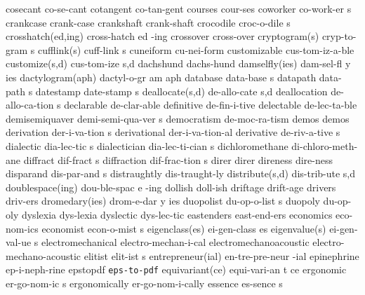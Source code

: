 \1 cosecant		co-se-cant
\1 cotangent		co-tan-gent
\1 courses		cour-ses
\5 coworker		co-work-er s		%
\1 crankcase		crank-case		%
\1 crankshaft		crank-shaft
\5 crocodile		croc-o-dile s
\2 crosshatch(ed,ing)	cross-hatch ed -ing
\1 crossover		cross-over		%
\2 cryptogram(s)	cryp-to-gram s		%
\2 cufflink(s)		cuff-link s		%
\1 cuneiform		cu-nei-form		%
\1 customizable		cus-tom-iz-a-ble	%
\2 customize(s,d)	cus-tom-ize s,d		%
\1 dachshund		dachs-hund
\3 damselfly(ies)	dam-sel-fl y ies	%
\3 dactylogram(aph)	dactyl-o-gr am aph	%
\5 database		data-base s
\5 datapath		data-path s
\5 datestamp		date-stamp s            %
\2 deallocate(s,d)	de-allo-cate s,d	%
\5 deallocation		de-allo-ca-tion s	%
\1 declarable		de-clar-able
\1 definitive		de-fin-i-tive
\1 delectable		de-lec-ta-ble
\5 demisemiquaver	demi-semi-qua-ver s	%
\1 democratism		de-moc-ra-tism
\1 demos		demos	
\5 derivation		der-i-va-tion s		%
\1 derivational		der-i-va-tion-al	%
\5 derivative		de-riv-a-tive s
\5 dialectic		dia-lec-tic s		%
\5 dialectician		dia-lec-ti-cian s	%
\1 dichloromethane	di-chloro-meth-ane	%
\5 diffract		dif-fract s
\5 diffraction		dif-frac-tion s		%
\1 direr		direr
\1 direness		dire-ness
\5 disparand		dis-par-and s
\1 distraughtly		dis-traught-ly
\2 distribute(s,d)	dis-trib-ute s,d
\3 doublespace(ing)	dou-ble-spac e -ing
\1 dollish		doll-ish
\1 driftage		drift-age
\1 drivers		driv-ers             %
\3 dromedary(ies)	drom-e-dar y ies
\5 duopolist		du-op-o-list s
\1 duopoly		du-op-oly
\1 dyslexia		dys-lexia		%
\1 dyslectic		dys-lec-tic		%
\1 eastenders		east-end-ers
\1 economics		eco-nom-ics
\5 economist		econ-o-mist s
\2 eigenclass(es)	ei-gen-class es		%
\2 eigenvalue(s)	ei-gen-val-ue s		%
\1 electromechanical	electro-mechan-i-cal
\1 electromechanoacoustic  electro-mechano-acoustic
\5 elitist		elit-ist s
\2 entrepreneur(ial)	en-tre-pre-neur -ial
\1 epinephrine		ep-i-neph-rine
\1 epstopdf		{\tt eps-to-pdf}	%
\3 equivariant(ce)	equi-vari-an t ce
\5 ergonomic		er-go-nom-ic s		%
\1 ergonomically	er-go-nom-i-cally	%
\5 essence		es-sence s		%
